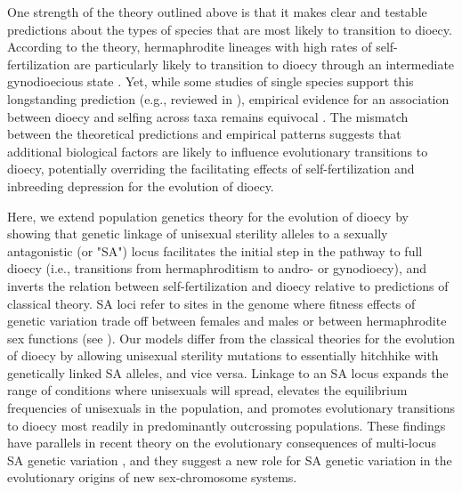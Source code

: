 \documentclass{article}
\begin{document}
One strength of the theory outlined above is that it makes clear and testable predictions about the types of species that are most likely to transition to dioecy. According to the theory, hermaphrodite lineages with high rates of self-fertilization are particularly likely to transition to dioecy through an intermediate gynodioecious state \citep{Charlesworth1978a, Charlesworth1999, KaferPannell2017}. Yet, while some studies of single species support this longstanding prediction (e.g., reviewed in \citealt{Webb1999, DufayBillard2012}), empirical evidence for an association between dioecy and selfing across taxa remains equivocal \citep{Charlesworth1985, Charlesworth2006, Renner2014}. The mismatch between the theoretical predictions and empirical patterns suggests that additional biological factors are likely to influence evolutionary transitions to dioecy, potentially overriding the facilitating effects of self-fertilization and inbreeding depression for the evolution of dioecy.

Here, we extend population genetics theory for the evolution of dioecy by showing that genetic linkage of unisexual sterility alleles to a sexually antagonistic (or "SA") locus facilitates the initial step in the pathway to full dioecy (i.e., transitions from hermaphroditism to andro- or gynodioecy), and inverts the relation between self-fertilization and dioecy relative to predictions of classical theory. SA loci refer to sites in the genome where fitness effects of genetic variation trade off between females and males or between hermaphrodite sex functions (see \citealt{Gregorious1982, Morgan1992a, Morgan1992b, JordanConnallon2014, Olito2017}). Our models differ from the classical theories for the evolution of dioecy \citep{Charlesworth1978a} by allowing unisexual sterility mutations to essentially hitchhike with genetically linked SA alleles, and vice versa. Linkage to an SA locus expands the range of conditions where unisexuals will spread, elevates the equilibrium frequencies of unisexuals in the population, and promotes evolutionary transitions to dioecy most readily in predominantly outcrossing populations. These findings have parallels in recent theory on the evolutionary consequences of multi-locus SA genetic variation \citep{ConnallonClark2010, Patten2010, UbedaPatten2010, ConnallonJordan2016, Olito2017}, and they suggest a new role for SA genetic variation in the evolutionary origins of new sex-chromosome systems.
\end{document}
